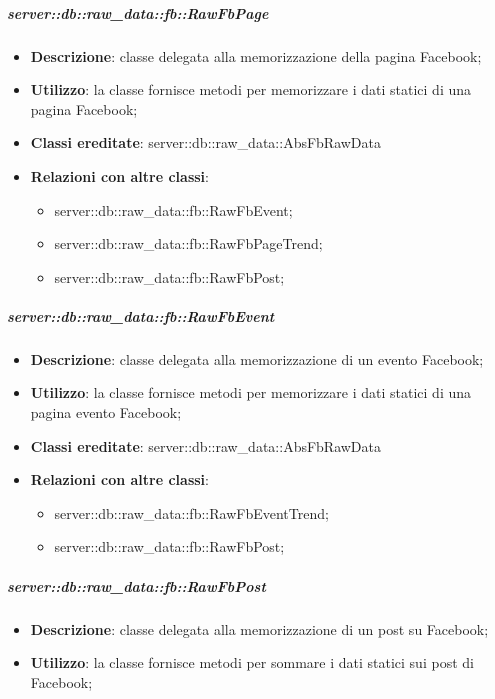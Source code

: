 		\subparagraph{server::db::raw\_data::fb::RawFbPage} %
		\label{subp:server_db_raw_data_fb_rawfbpage}
			\begin{itemize}
				\item \textbf{Descrizione}: classe delegata alla memorizzazione della pagina Facebook;
				\item \textbf{Utilizzo}: la classe fornisce metodi per memorizzare i dati statici di una pagina Facebook;
				\item \textbf{Classi ereditate}: server::db::raw\_data::AbsFbRawData
				\item \textbf{Relazioni con altre classi}:
					\begin{itemize}
						\item server::db::raw\_data::fb::RawFbEvent;
						\item server::db::raw\_data::fb::RawFbPageTrend;
						\item server::db::raw\_data::fb::RawFbPost;
					\end{itemize}
			\end{itemize}


		\subparagraph{server::db::raw\_data::fb::RawFbEvent} %
		\label{subp:server_db_raw_data_fb_rawfbevent}
			\begin{itemize}
				\item \textbf{Descrizione}: classe delegata alla memorizzazione di un evento Facebook;
				\item \textbf{Utilizzo}: la classe fornisce metodi per memorizzare i dati statici di una pagina evento Facebook;
				\item \textbf{Classi ereditate}: server::db::raw\_data::AbsFbRawData
				\item \textbf{Relazioni con altre classi}:
					\begin{itemize}
						\item server::db::raw\_data::fb::RawFbEventTrend;
						\item server::db::raw\_data::fb::RawFbPost;
					\end{itemize}
			\end{itemize}


		\subparagraph{server::db::raw\_data::fb::RawFbPost} %
		\label{subp:server_db_raw_data_fb_rawfbpost}
			\begin{itemize}
				\item \textbf{Descrizione}: classe delegata alla memorizzazione di un post su Facebook;
				\item \textbf{Utilizzo}: la classe fornisce metodi per sommare i dati statici sui post di Facebook;
			\end{itemize}


